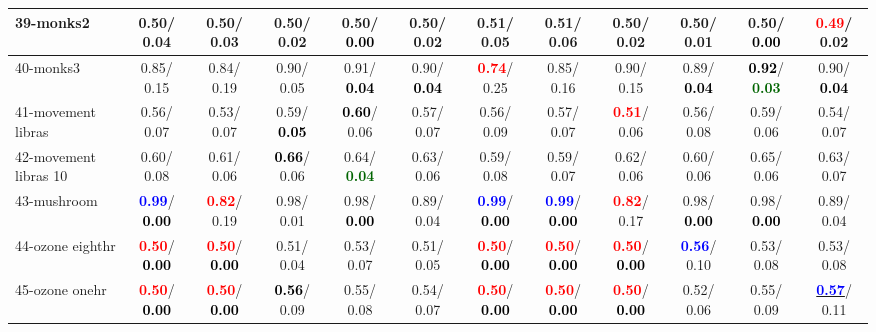 \begin{table}[h]
\begin{center}
{\begin{tabular}{lc|c|c|c|c|c|c|c|c|c|c}
39-monks2 &   0.50/  0.04 &   0.50/  0.03 &   0.50/  0.02 &   0.50/\textcolor{black}{\textbf{  0.00}} &   0.50/  0.02 &   0.51/  0.05 &   0.51/  0.06 &   0.50/  0.02 &   0.50/  0.01 &   0.50/\textcolor{black}{\textbf{  0.00}} & \textcolor{red}{\textbf{  0.49}}/  0.02 \\ \hline
40-monks3 &   0.85/  0.15 &   0.84/  0.19 &   0.90/  0.05 &   0.91/\textcolor{black}{\textbf{  0.04}} &   0.90/\textcolor{black}{\textbf{  0.04}} & \textcolor{red}{\textbf{  0.74}}/  0.25 &   0.85/  0.16 &   0.90/  0.15 &   0.89/\textcolor{black}{\textbf{  0.04}} & \textcolor{black}{\textbf{  0.92}}/\textcolor{darkgreen}{\textbf{  0.03}} &   0.90/\textcolor{black}{\textbf{  0.04}} \\
41-movement libras &   0.56/  0.07 &   0.53/  0.07 &   0.59/\textcolor{black}{\textbf{  0.05}} & \textcolor{black}{\textbf{  0.60}}/  0.06 &   0.57/  0.07 &   0.56/  0.09 &   0.57/  0.07 & \textcolor{red}{\textbf{  0.51}}/  0.06 &   0.56/  0.08 &   0.59/  0.06 &   0.54/  0.07 \\
42-movement libras 10 &   0.60/  0.08 &   0.61/  0.06 & \textcolor{black}{\textbf{  0.66}}/  0.06 &   0.64/\textcolor{darkgreen}{\textbf{  0.04}} &   0.63/  0.06 &   0.59/  0.08 &   0.59/  0.07 &   0.62/  0.06 &   0.60/  0.06 &   0.65/  0.06 &   0.63/  0.07 \\
43-mushroom & \textcolor{blue}{\textbf{  0.99}}/\textcolor{black}{\textbf{  0.00}} & \textcolor{red}{\textbf{  0.82}}/  0.19 &   0.98/  0.01 &   0.98/\textcolor{black}{\textbf{  0.00}} &   0.89/  0.04 & \textcolor{blue}{\textbf{  0.99}}/\textcolor{black}{\textbf{  0.00}} & \textcolor{blue}{\textbf{  0.99}}/\textcolor{black}{\textbf{  0.00}} & \textcolor{red}{\textbf{  0.82}}/  0.17 &   0.98/\textcolor{black}{\textbf{  0.00}} &   0.98/\textcolor{black}{\textbf{  0.00}} &   0.89/  0.04 \\
44-ozone eighthr & \textcolor{red}{\textbf{  0.50}}/\textcolor{black}{\textbf{  0.00}} & \textcolor{red}{\textbf{  0.50}}/\textcolor{black}{\textbf{  0.00}} &   0.51/  0.04 &   0.53/  0.07 &   0.51/  0.05 & \textcolor{red}{\textbf{  0.50}}/\textcolor{black}{\textbf{  0.00}} & \textcolor{red}{\textbf{  0.50}}/\textcolor{black}{\textbf{  0.00}} & \textcolor{red}{\textbf{  0.50}}/\textcolor{black}{\textbf{  0.00}} & \textcolor{blue}{\textbf{  0.56}}/  0.10 &   0.53/  0.08 &   0.53/  0.08 \\
45-ozone onehr & \textcolor{red}{\textbf{  0.50}}/\textcolor{black}{\textbf{  0.00}} & \textcolor{red}{\textbf{  0.50}}/\textcolor{black}{\textbf{  0.00}} & \textcolor{black}{\textbf{  0.56}}/  0.09 &   0.55/  0.08 &   0.54/  0.07 & \textcolor{red}{\textbf{  0.50}}/\textcolor{black}{\textbf{  0.00}} & \textcolor{red}{\textbf{  0.50}}/\textcolor{black}{\textbf{  0.00}} & \textcolor{red}{\textbf{  0.50}}/\textcolor{black}{\textbf{  0.00}} &   0.52/  0.06 &   0.55/  0.09 & \underline{\textcolor{blue}{\textbf{  0.57}}}/  0.11 \\

\end{tabular}}
\end{center}
\end{table}
